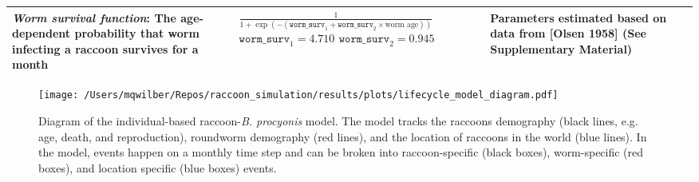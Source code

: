 \documentclass[11pt]{article}
\begin{document}
\begin{longtable}{p{4.5cm} p{4.5cm} p{5cm}}
\hline
\emph{Worm survival function}: The age-dependent probability that worm infecting a raccoon survives for a month & $\frac{1}{1 + \exp(-(\texttt{worm\_surv}_1 + \texttt{worm\_surv}_2\times \text{worm age}))}$ \newline\newline $\texttt{worm\_surv}_1 = 4.710$ \newline $\texttt{worm\_surv}_2 = 0.945$  & Parameters estimated based on data from [Olsen 1958] (See Supplementary Material)  \\
\bottomrule
\end{longtable}

\clearpage

\begin{figure}
    \texttt{[image: /Users/mqwilber/Repos/raccoon\_simulation/results/plots/lifecycle\_model\_diagram.pdf]}
    \caption{Diagram of the individual-based raccoon-\emph{B. procyonis} model.  The model tracks the raccoons demography (black lines, e.g. age, death, and reproduction), roundworm demography (red lines), and the location of raccoons in the world (blue lines).  In the model, events happen on a monthly time step and can be broken into raccoon-specific (black boxes), worm-specific (red boxes), and location specific (blue boxes) events.}
    \label{fig:mod_diagram}
\end{figure}
\end{document}
